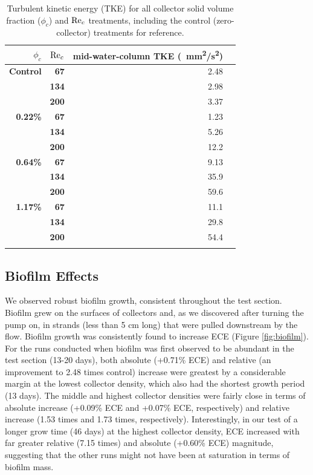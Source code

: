 \documentclass[geosciences,article,submit,moreauthors,pdftex]{Definitions/mdpi}
\begin{document}
\begin{table}[H]
\caption{Turbulent kinetic energy (TKE) for all collector solid volume fraction ($\phi_c$) and $\mathrm{Re}_c$ treatments, including the control (zero-collector) treatments for reference.}
\centering
\begin{tabular}{>{\bfseries}r>{\bfseries}rrr}
\toprule
\textbf{$\phi_c$}&\textbf{$\mathrm{Re}_c$}&\textbf{mid-water-column TKE (\SI{}{\milli\metre^2/\second^2})}\\
\midrule
Control &   67  & \num{2.48}\\
        &   134 & \num{2.98}\\
        &   200 & \num{3.37}\\
\midrule
0.22\% &   67  & \num{1.23}\\
        &   134 & \num{5.26}\\
        &   200 & \num{12.2}\\
\midrule
0.64\% &   67  & \num{9.13}\\
        &   134 & \num{35.9}\\
        &   200 & \num{59.6}\\
\midrule
1.17\%  &   67  & \num{11.1}\\
        &   134 & \num{29.8}\\
        &   200 & \num{54.4}\\
\bottomrule
\label{tbl:turbulence}
\end{tabular}
\end{table}



\subsection{Biofilm Effects}

We observed robust biofilm growth, consistent throughout the test section. Biofilm grew on the surfaces of collectors and, as we discovered after turning the pump on, in strands (less than 5 cm long) that were pulled downstream by the flow. Biofilm growth was consistently found to increase ECE (Figure \ref{fig:biofilm}). For the runs conducted when biofilm was first observed to be abundant in the test section (13-20 days), both absolute (+0.71\% ECE) and relative (an improvement to 2.48 times control) increase were greatest by a considerable margin at the lowest collector density, which also had the shortest growth period (13 days). The middle and highest collector densities were fairly close in terms of absolute increase (+0.09\% ECE and +0.07\% ECE, respectively) and relative increase (1.53 times and 1.73 times, respectively). Interestingly, in our test of a longer grow time (46 days) at the highest collector density, ECE increased with far greater relative (7.15 times) and absolute (+0.60\% ECE) magnitude, suggesting that the other runs might not have been at saturation in terms of biofilm mass.
\end{document}
